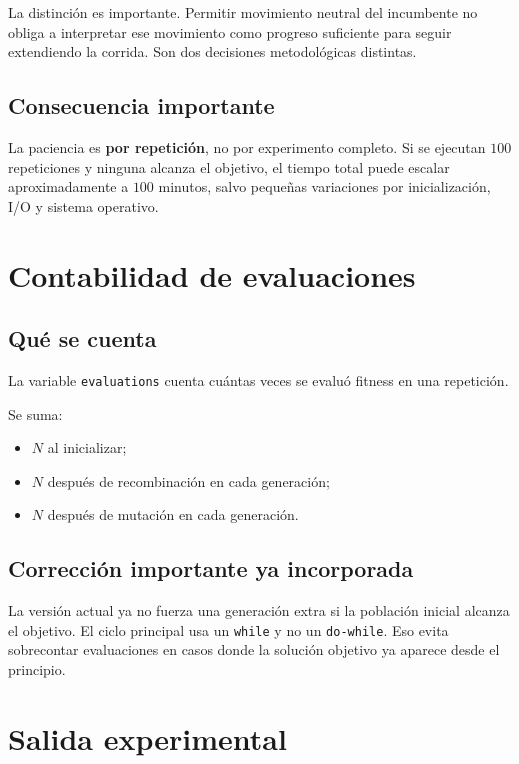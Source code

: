\documentclass[11pt]{article}
\begin{document}
La distinci\'on es importante. Permitir movimiento neutral del incumbente no
obliga a interpretar ese movimiento como progreso suficiente para seguir
extendiendo la corrida. Son dos decisiones metodol\'ogicas distintas.

\subsection{Consecuencia importante}

La paciencia es \textbf{por repetici\'on}, no por experimento completo. Si se
ejecutan \(100\) repeticiones y ninguna alcanza el objetivo, el tiempo total
puede escalar aproximadamente a \(100\) minutos, salvo peque\~nas variaciones
por inicializaci\'on, I/O y sistema operativo.

\section{Contabilidad de evaluaciones}

\subsection{Qu\'e se cuenta}

La variable \texttt{evaluations} cuenta cu\'antas veces se evalu\'o fitness en
una repetici\'on.

Se suma:

\begin{itemize}
  \item \(N\) al inicializar;
  \item \(N\) despu\'es de recombinaci\'on en cada generaci\'on;
  \item \(N\) despu\'es de mutaci\'on en cada generaci\'on.
\end{itemize}

\subsection{Correcci\'on importante ya incorporada}

La versi\'on actual ya no fuerza una generaci\'on extra si la poblaci\'on
inicial alcanza el objetivo. El ciclo principal usa un \texttt{while} y no un
\texttt{do-while}. Eso evita sobrecontar evaluaciones en casos donde la
soluci\'on objetivo ya aparece desde el principio.

\section{Salida experimental}
\end{document}
